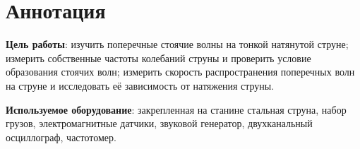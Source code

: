 \section{Аннотация}
\textbf{Цель работы}: изучить поперечные стоячие волны на тонкой натянутой струне; измерить собственные частоты колебаний струны и проверить условие образования стоячих волн; измерить скорость распространения поперечных волн на струне и исследовать её зависимость от натяжения струны.

\noindent
\textbf{Используемое оборудование}: закрепленная на станине стальная струна, набор грузов, электромагнитные датчики, звуковой генератор, двухканальный осциллограф, частотомер.
